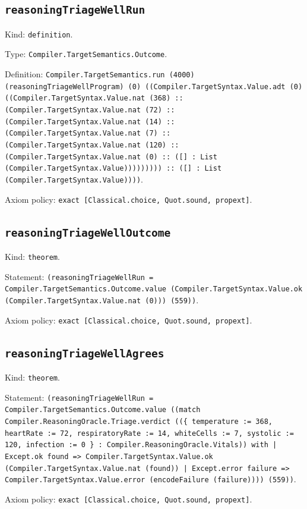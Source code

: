 \documentclass[11pt]{article}
\begin{document}
\subsection*{\texttt{reasoningTriageWellRun}}
\noindent Kind: \texttt{definition}.\par
\noindent Type: \texttt{Compiler.TargetSemantics.Outcome}.\par
\noindent Definition: \texttt{Compiler.TargetSemantics.run (4000) (reasoningTriageWellProgram) (0) ((Compiler.TargetSyntax.Value.adt (0) ((Compiler.TargetSyntax.Value.nat (368) :: (Compiler.TargetSyntax.Value.nat (72) :: (Compiler.TargetSyntax.Value.nat (14) :: (Compiler.TargetSyntax.Value.nat (7) :: (Compiler.TargetSyntax.Value.nat (120) :: (Compiler.TargetSyntax.Value.nat (0) :: ([] : List (Compiler.TargetSyntax.Value))))))))) :: ([] : List (Compiler.TargetSyntax.Value))))}.\par
\noindent Axiom policy: \texttt{exact [Classical.choice, Quot.sound, propext]}.\par
\subsection*{\texttt{reasoningTriageWellOutcome}}
\noindent Kind: \texttt{theorem}.\par
\noindent Statement: \texttt{(reasoningTriageWellRun = Compiler.TargetSemantics.Outcome.value (Compiler.TargetSyntax.Value.ok (Compiler.TargetSyntax.Value.nat (0))) (559))}.\par
\noindent Axiom policy: \texttt{exact [Classical.choice, Quot.sound, propext]}.\par
\subsection*{\texttt{reasoningTriageWellAgrees}}
\noindent Kind: \texttt{theorem}.\par
\noindent Statement: \texttt{(reasoningTriageWellRun = Compiler.TargetSemantics.Outcome.value ((match Compiler.ReasoningOracle.Triage.verdict ((\{ temperature := 368, heartRate := 72, respiratoryRate := 14, whiteCells := 7, systolic := 120, infection := 0 \} : Compiler.ReasoningOracle.Vitals)) with | Except.ok found => Compiler.TargetSyntax.Value.ok (Compiler.TargetSyntax.Value.nat (found)) | Except.error failure => Compiler.TargetSyntax.Value.error (encodeFailure (failure)))) (559))}.\par
\noindent Axiom policy: \texttt{exact [Classical.choice, Quot.sound, propext]}.\par
\end{document}
